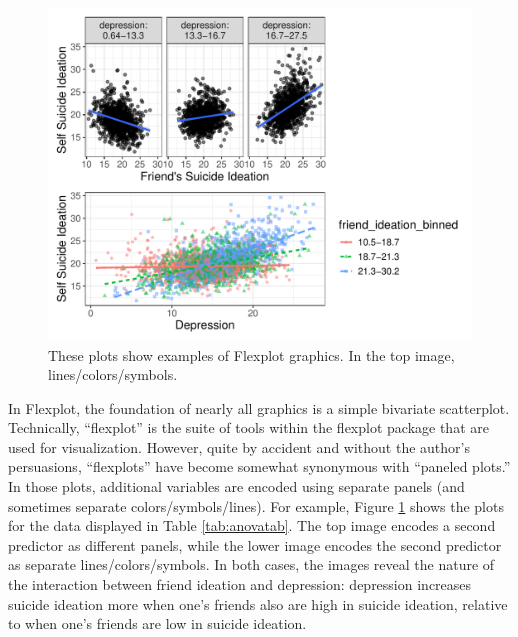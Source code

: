 \documentclass[
  man,floatsintext]{apa6}
\begin{document}
\begin{figure}

{\centering \includegraphics[width=0.7\linewidth]{visual_partitions_files/figure-latex/flexplotexample-1} 

}

\caption{These plots show examples of Flexplot graphics. In the top image,  lines/colors/symbols.}\label{fig:flexplotexample}
\end{figure}

In Flexplot, the foundation of nearly all graphics is a simple bivariate scatterplot. Technically, ``flexplot'' is the suite of tools within the flexplot package that are used for visualization. However, quite by accident and without the author's persuasions, ``flexplots'' have become somewhat synonymous with ``paneled plots.'' In those plots, additional variables are encoded using separate panels (and sometimes separate colors/symbols/lines). For example, Figure \ref{fig:flexplotexample} shows the plots for the data displayed in Table \ref{tab:anovatab}. The top image encodes a second predictor as different panels, while the lower image encodes the second predictor as separate lines/colors/symbols. In both cases, the images reveal the nature of the interaction between friend ideation and depression: depression increases suicide ideation more when one's friends also are high in suicide ideation, relative to when one's friends are low in suicide ideation.
\end{document}
